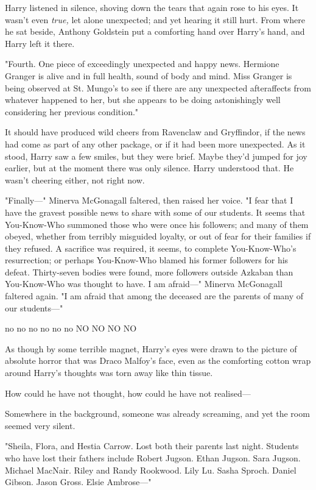 Harry listened in silence, shoving down the tears that again rose to his eyes.
It wasn't even \emph{true,} let alone unexpected; and yet hearing it still
hurt. From where he sat beside, Anthony Goldstein put a comforting hand over
Harry's hand, and Harry left it there.

"Fourth. One piece of exceedingly unexpected and happy news. Hermione Granger
is alive and in full health, sound of body and mind. Miss Granger is being
observed at St. Mungo's to see if there are any unexpected afteraffects from
whatever happened to her, but she appears to be doing astonishingly well
considering her previous condition."

It should have produced wild cheers from Ravenclaw and Gryffindor, if the news
had come as part of any other package, or if it had been more unexpected. As it
stood, Harry saw a few smiles, but they were brief. Maybe they'd jumped for joy
earlier, but at the moment there was only silence. Harry understood that. He
wasn't cheering either, not right now.

"Finally---" Minerva McGonagall faltered, then raised her voice. "I fear that I
have the gravest possible news to share with some of our students. It seems
that You-Know-Who summoned those who were once his followers; and many of them
obeyed, whether from terribly misguided loyalty, or out of fear for their
families if they refused. A sacrifice was required, it seems, to complete
You-Know-Who's resurrection; or perhaps You-Know-Who blamed his former
followers for his defeat. Thirty-seven bodies were found, more followers
outside Azkaban than You-Know-Who was thought to have. I am afraid---" Minerva
McGonagall faltered again. "I am afraid that among the deceased are the parents
of many of our students---"

no no no no no no NO NO NO NO

As though by some terrible magnet, Harry's eyes were drawn to the picture of
absolute horror that was Draco Malfoy's face, even as the comforting cotton
wrap around Harry's thoughts was torn away like thin tissue.

How could he have not thought, how could he have not realised---

Somewhere in the background, someone was already screaming, and yet the room
seemed very silent.

"Sheila, Flora, and Hestia Carrow. Lost both their parents last night. Students
who have lost their fathers include Robert Jugson. Ethan Jugson. Sara Jugson.
Michael MacNair. Riley and Randy Rookwood. Lily Lu. Sasha Sproch. Daniel
Gibson. Jason Gross. Elsie Ambrose---"

